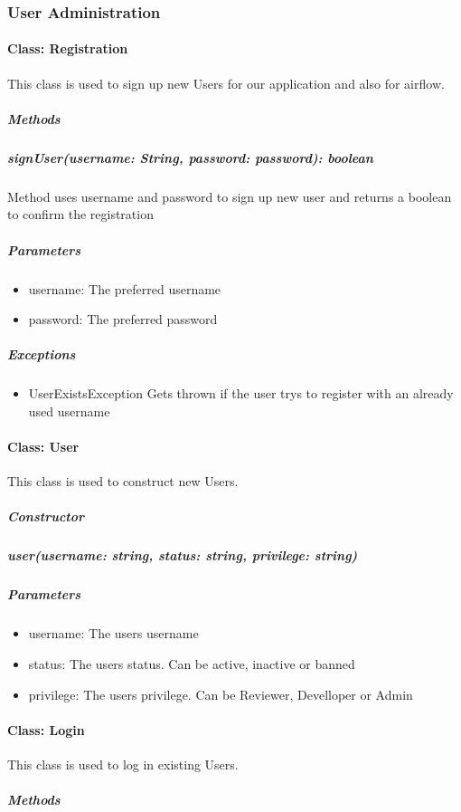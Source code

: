 \subsubsection{User Administration}


\paragraph{Class: Registration}
This class is used to sign up new Users for our application and also for airflow.
\subparagraph{Methods}

\subparagraph{signUser(username: String, password: password): boolean}

Method uses username and password to sign up new user and returns a boolean to confirm the registration

\subparagraph{Parameters}
\begin{itemize}
	\item{username:}
	The preferred username
	\item{password:}
	The preferred password
\end{itemize}

\subparagraph{Exceptions}
\begin{itemize}
	\item{UserExistsException}
	Gets thrown if the user trys to register with an already used username
\end{itemize}



\paragraph{Class: User}
This class is used to construct new Users.
\subparagraph{Constructor}

\subparagraph{user(username: string, status: string, privilege: string)}

\subparagraph{Parameters}

\begin{itemize}
	\item{username:}
	The users username
	\item{status:}
	The users status. Can be active, inactive or banned
	\item{privilege:}
	The users privilege. Can be Reviewer, Develloper or Admin
\end{itemize}



\paragraph{Class: Login}
This class is used to log in existing Users.
\subparagraph{Methods}

